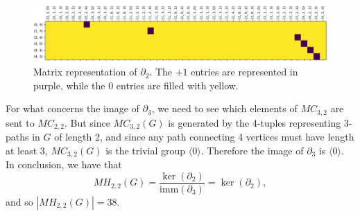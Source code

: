 \documentclass[runningheads]{llncs}
\newcommand{\imm}{\mathrm{imm}}
\begin{document}
\begin{example}
\begin{figure}
\hspace{-1cm}
\includegraphics[scale=0.45]{images/kernel_toy_example.png}
\caption{Matrix representation of $\partial_2$. The $+1$ entries are represented in purple, while the $0$ entries are filled with yellow.}
\end{figure}

For what concerns the image of $\partial_3$, we need to see which elements of $MC_{3,2}$ are sent to $MC_{2,2}$.
But since $MC_{3,2}(G)$ is generated by the 4-tuples representing $3$-paths in $G$ of length $2$, and since any path connecting 4 vertices must have length at least 3, $MC_{3,2}(G)$ is the trivial group $\langle 0 \rangle$.
Therefore the image of $\partial_3$ is $\langle 0 \rangle$.
In conclusion, we have that 
\[
MH_{2,2}(G)=\frac{\ker(\partial_2)}{\imm(\partial_3)}=\ker(\partial_2),
\]
and so $|MH_{2,2}(G)|=38$.
\end{example}
\end{document}
